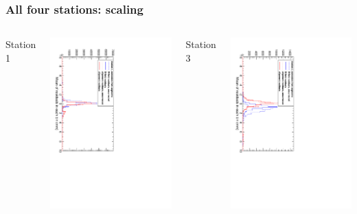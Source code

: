 \documentclass[compress]{beamer}
\begin{document}
\begin{frame}
\frametitle{All four stations: scaling}

\begin{columns}
Station 1

\includegraphics[height=\linewidth, angle=90]{scaling_corrections_station1.pdf}

\vspace{1 cm}
Station 3

\includegraphics[height=\linewidth, angle=90]{scaling_corrections_station3.pdf}


\end{columns}
\end{frame}
\end{document}
